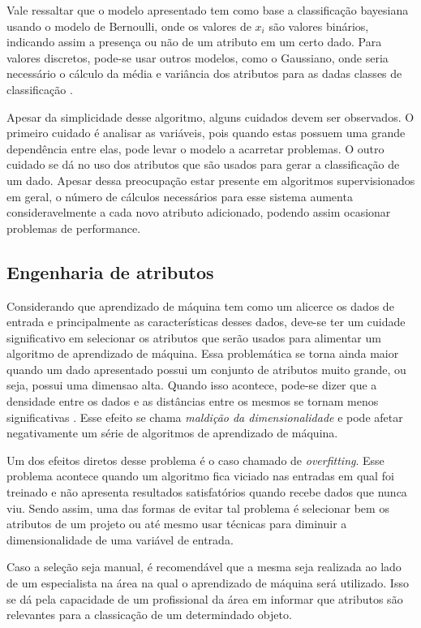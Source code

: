 Vale ressaltar que o modelo apresentado tem como base a classificação
bayesiana usando o modelo de Bernoulli, onde os valores de $x_{i}$ são valores
binários, indicando assim a presença ou não de um atributo em um certo dado.
Para valores discretos, pode-se usar outros modelos, como o Gaussiano, onde
seria necessário o cálculo da média e variância dos atributos para as dadas
classes de classificação \cite{zhang2004optimality}.

Apesar da simplicidade desse algoritmo, alguns cuidados devem ser observados.
O primeiro cuidado é analisar as variáveis, pois quando estas possuem uma grande
dependência entre elas, pode levar o modelo a acarretar problemas. O outro cuidado
se dá no uso dos atributos que são usados para gerar a classificação de um dado.
Apesar dessa preocupação estar presente em algoritmos supervisionados em geral,
o número de cálculos necessários para esse sistema aumenta consideravelmente a
cada novo atributo adicionado, podendo assim ocasionar problemas de performance.

\subsection{Engenharia de atributos}

Considerando que aprendizado de máquina tem como um alicerce os dados de entrada
e principalmente as características desses dados, deve-se ter um cuidade
significativo em selecionar os atributos que serão usados para alimentar um
algoritmo de aprendizado de máquina. Essa problemática se torna ainda maior
quando um dado apresentado possui um conjunto de atributos muito grande, ou
seja, possui uma dimensao alta. Quando isso acontece, pode-se dizer que a
densidade entre os dados e as distâncias entre os mesmos se tornam menos
significativas \cite{amatriain2011data}. Esse efeito se chama \textit{maldição
da dimensionalidade} e pode afetar negativamente um série de algoritmos de
aprendizado de máquina.

Um dos efeitos diretos desse problema é o caso chamado de \textit{overfitting}.
Esse problema acontece quando um algoritmo fica viciado nas entradas em qual foi
treinado e não apresenta resultados satisfatórios quando recebe dados que nunca
viu. Sendo assim, uma das formas de evitar tal problema é selecionar bem os
atributos de um projeto ou até mesmo usar técnicas para diminuir a
dimensionalidade de uma variável de entrada.

Caso a seleção seja manual, é recomendável que a mesma seja realizada ao lado de
um especialista na área na qual o aprendizado de máquina será utilizado. Isso se
dá pela capacidade de um profissional da área em informar que atributos são
relevantes para a classicação de um determindado objeto.

